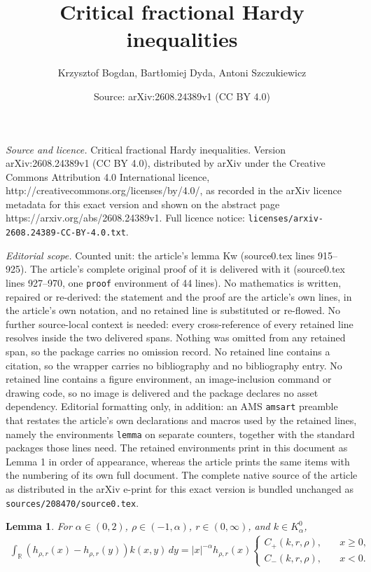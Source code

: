 \documentclass[10pt,a4paper]{amsart}
\title{Critical fractional Hardy inequalities}
\author{Krzysztof Bogdan, Bart{\l}omiej Dyda, Antoni Szczukiewicz}
\date{Source: arXiv:2608.24389v1 (CC BY 4.0)}
\newtheorem{lemma}{Lemma}
\newcommand{\R}{\mathbb{R}}
\begin{document}
\maketitle

\noindent\emph{Source and licence.} Critical fractional Hardy inequalities. Version arXiv:2608.24389v1 (CC BY 4.0), distributed by arXiv under the Creative Commons Attribution 4.0 International licence, http://creativecommons.org/licenses/by/4.0/, as recorded in the arXiv licence metadata for this exact version and shown on the abstract page https://arxiv.org/abs/2608.24389v1. Full licence notice: \texttt{licenses/arxiv-2608.24389-CC-BY-4.0.txt}.\par\smallskip

\noindent\textit{Editorial scope.} Counted unit: the article's lemma Kw (source0.tex lines 915--925). The article's complete original proof of it is delivered with it (source0.tex lines 927--970, one \texttt{proof} environment of 44 lines). No mathematics is written, repaired or re-derived: the statement and the proof are the article's own lines, in the article's own notation, and no retained line is substituted or re-flowed.  No further source-local context is needed: every cross-reference of every retained line resolves inside the two delivered spans.  Nothing was omitted from any retained span, so the package carries no omission record.  No retained line contains a citation, so the wrapper carries no bibliography and no bibliography entry.  No retained line contains a figure environment, an image-inclusion command or drawing code, so no image is delivered and the package declares no asset dependency.  Editorial formatting only, in addition: an AMS \texttt{amsart} preamble that restates the article's own declarations and macros used by the retained lines, namely the environments \texttt{lemma} on separate counters, together with the standard packages those lines need.  The retained environments print in this document as Lemma 1 in order of appearance, whereas the article prints the same items with the numbering of its own full document.  The complete native source of the article as distributed in the arXiv e-print for this exact version is bundled unchanged as \texttt{sources/208470/source0.tex}.
\begin{lemma}
\label{lemma: rownosc Kw}
For $\alpha \in (0, 2)$, $\rho \in (-1, \alpha)$, $r \in (0, \infty)$, and $k \in K_\alpha^0$,
\begin{align}
\label{equation: rownosc Kw}
    \int_{\R}(h_{\rho, r}(x) - h_{\rho, r}(y))k(x, y)\,dy = |x|^{-\alpha}h_{\rho, r}(x)\begin{cases}
        C_{+}(k, r, \rho), \quad &x \geq 0, \\
        C_{-}(k, r, \rho), \quad &x < 0.
    \end{cases}
\end{align}
\end{lemma}
\end{document}
